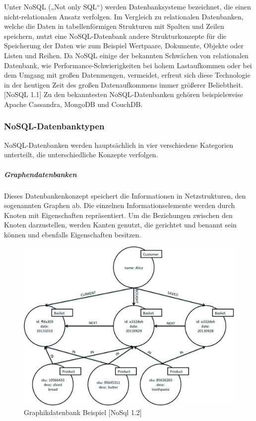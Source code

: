 Unter NoSQL („Not only SQL“) werden Datenbanksysteme bezeichnet, die einen nicht-relationalen Ansatz verfolgen. Im Vergleich zu relationalen Datenbanken, welche die Daten in tabellenförmigen Strukturen mit Spalten und Zeilen speichern, nutzt eine NoSQL-Datenbank andere Strukturkonzepte für die Speicherung der Daten wie zum Beispiel Wertpaare, Dokumente, Objekte oder Listen und Reihen. Da NoSQL einige der bekannten Schwächen von relationalen Datenbank, wie Performance-Schwierigkeiten bei hohem Lastaufkommen oder bei dem Umgang mit großen Datenmengen, vermeidet, erfreut sich diese Technologie in der heutigen Zeit des großen Datenaufkommens immer größerer Beliebtheit. [NoSQL 1.1]
Zu den bekanntesten NoSQL-Datenbanken gehören beispielsweise Apache Cassandra, MongoDB und CouchDB.
\newline

\subsubsection{NoSQL-Datenbanktypen}
NoSQL-Datenbanken werden hauptsächlich in vier verschiedene Kategorien unterteilt, die unterschiedliche Konzepte verfolgen.
\newline

\subparagraph{Graphendatenbanken}
Dieses Datenbankenkonzept speichert die Informationen in Netzstrukturen, den sogenannten Graphen ab. Die einzelnen Informationselemente werden durch Knoten mit Eigenschaften repräsentiert. Um die Beziehungen zwischen den Knoten darzustellen, werden Kanten genutzt, die gerichtet und benannt sein können und ebenfalls Eigenschaften besitzen.

\begin{figure}[h]
\centering
\includegraphics[]{images/graphikdatabase.jpg}
\caption{Graphikdatenbank Beispiel [NoSql 1.2]}
\end{figure}

